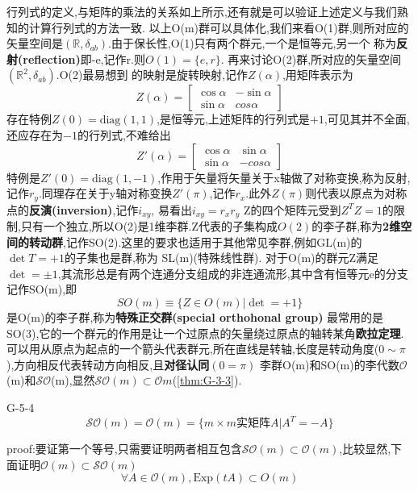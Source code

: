 \documentclass[../main.tex]{subfiles}
\begin{document}
行列式的定义,与矩阵的乘法的关系如上所示,还有就是可以验证上述定义与我们熟知的计算行列式的方法一致.
以上O(m)群可以具体化,我们来看O(1)群,则所对应的矢量空间是$(\mathbb{R},\delta_{ab})$.由于保长性,O(1)只有两个群元,一个是恒等元,另一个
称为\textbf{反射(reflection)}即-e,记作r.则$O(1)= \{e,r\}$.
再来讨论O(2)群,所对应的矢量空间$(\mathbb{R}^2,\delta_{ab})$.O(2)最易想到
的映射是旋转映射,记作$Z(\alpha)$,用矩阵表示为
\begin{equation*}
    Z(\alpha) = \begin{bmatrix}
        \cos\alpha&-\sin \alpha\\
        \sin\alpha&cos\alpha
    \end{bmatrix}
\end{equation*}
存在特例$Z(0) = \text{diag}(1,1)$,是恒等元,上述矩阵的行列式是$+1$,可见其并不全面,还应存在为$-1$的行列式,不难给出
\begin{equation*}
    Z'(\alpha) = \begin{bmatrix}
        \cos\alpha&\sin \alpha\\
        \sin\alpha&-cos\alpha
    \end{bmatrix}
\end{equation*}
特例是$Z'(0) = \text{diag}(1,-1)$,作用于矢量将矢量关于x轴做了对称变换,称为反射,记作$r_y$.同理存在关于y轴对称变换$Z'(\pi)$,记作$r_x$.此外$Z(\pi)$则代表以原点为对称点的\textbf{反演(inversion)},记作$i_{xy}$,
易看出$i_{xy} = r_xr_y$
Z的四个矩阵元受到$Z^TZ =1$的限制,只有一个独立,所以O(2)是1维李群.Z代表的子集构成$O(2)$的李子群,称为\textbf{2维空间的转动群},记作SO(2).这里的要求也适用于其他常见李群,例如GL(m)的$\det T = +1$的子集也是群,称为
SL(m)(特殊线性群).
对于O(m)的群元Z满足$\det = \pm 1$,其流形总是有两个连通分支组成的非连通流形,其中含有恒等元e的分支记作SO(m),即
$$SO(m) \equiv \{Z\in O(m)|\det = +1\}$$
是O(m)的李子群,称为\textbf{特殊正交群(special orthohonal group)}
最常用的是SO(3),它的一个群元的作用是让一个过原点的矢量绕过原点的轴转某角\textbf{欧拉定理}.可以用从原点为起点的一个箭头代表群元,所在直线是转轴,长度是转动角度($0\sim \pi$),方向相反代表转动方向相反,且\textbf{对径认同}$(0 = \pi)$
李群O(m)和SO(m)的李代数$\mathscr{O}$(m)和$\mathscr{SO}$(m),显然$\mathscr{SO}(m)\subset \mathscr{O}{m}$(\ref{thm:G-3-3}).
 \begin{theorem}{}{G-5-4}
    $$\mathscr{SO}(m) = \mathscr{O}(m) = \{m\times m \text{实矩阵}A|A^T = -A\}$$
 \end{theorem}
proof:要证第一个等号,只需要证明两者相互包含$\mathscr{SO}(m)\subset \mathscr{O}(m)$,比较显然,下面证明$\mathscr{O}(m)\subset\mathscr{SO}(m)$
$$\forall A \in \mathscr{O}(m),\text{Exp}(tA) \subset O(m)$$
\end{document}
